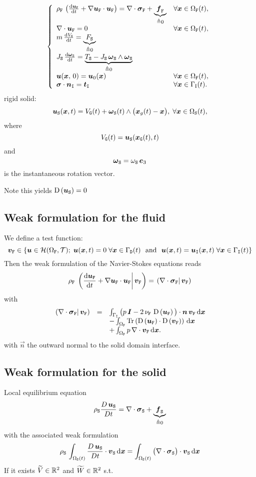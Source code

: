 \documentclass[10pt,a4paper]{article}
\begin{document}
\begin{equation}
\left\{
\begin{array}{ll}
\rhof\,\left(\dt{\vuf} + \grad \vuf\cdot \vuf \right)= \div \vsigmaf + \underbrace{\vf_\labf}_{\triangleq 0} & \forall \vx \in \domf(t),\\
\div \vuf = 0 & \forall \vx \in \domf(t), \\
m\,\dt{V_\labg} = \underbrace{F_\labs}_{\triangleq 0} \\
J_\labs\,\dt{\vomegas}  = \underbrace{T_{\labs}-J_\labs\,\vomegas\wedge\vomegas}_{\triangleq 0}\\
\vu(\vx, \,0) = \vu_{\mathrm{0}}(\vx) & \forall \vx \in \domf(t), \\
\vsigma\cdot \vn_{\labi} = \vti & \forall \vx \in \Gamma_{\mathrm{I}}(t).
\end{array}
\right.
\end{equation}
%
rigid solid: 
$$\vus(\vx, t)= V_\labg(t) + \vomegas(t)\wedge \big(\vxg(t) - \vx\big),\; \forall \vx \in \doms(t),$$
where $$V_\labg(t) = \vus(\vx_\labg(t), t)$$ and $$\vomegas = \omegas\,\vec e_3 $$ is the instantaneous rotation vector.
%

Note this yields $\D{\vus} = 0$

\subsection{Weak formulation for the fluid}
We define a test function:
$$\vvf \in \left\{\vu \in \sH(\domf, \sT);\; \vu(\vx, t) = 0 \; \forall \vx \in \boud(t) \mbox{~~and~~} \vu(\vx, t) = \vui(\vx, t)\; \forall \vx \in \boui(t) \right\} $$
%
Then the weak formulation of the Navier-Stokes equations reads
%
$$\rhof\,\prodscal{\dt \vuf + \grad \vuf \cdot \vuf}{\vvf}=\prodscal{\div\vsigmaf}{\vvf}$$
with
$$
\begin{array}{rcl}
\prodscal{\div\vsigmaf}{\vvf} &=& \int_{\boui}\big(p\,\Id- 2\,\nuf\,\D \vuf \big)\cdot \vec n\,\vvf\,\d \vx \\
&& - \int_{\domf} \trace{\D \vuf \cdot \D \vvf}\,\d \vx \\
&& + \int_{\domf}p\,\div \vvf\,\d \vx.
\end{array}
$$
with $\vec n$ the outward normal to the solid domain interface.
%
\subsection{Weak formulation for the solid}
%
Local equilibrium equation
%
$$\rhos \frac{D \, \vus}{D t} = \div \vsigmas + \underbrace{\vf_\labs}_{\triangleq 0} $$
%
with the associated weak formulation
$$ \rhos \,\int_{\doms(t)} \frac{D \, \vus}{D t} \cdot \vvs \, \d \vx = \int_{\doms(t)} \big(\div \vsigmas\big) \cdot \vvs \, \d \vx $$
%
If it exists $\tilde{V}\in \RR^2$ and $\tilde{W}\in \RR ^2$ s.t.
\end{document}
